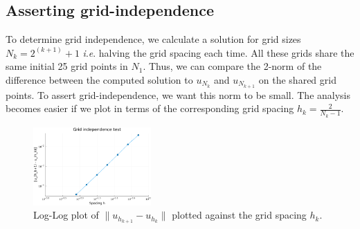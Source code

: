 \documentclass{article}
\numberwithin{equation}{section}
\theoremstyle{definition}
\newcommand{\ie}{\textit{i}.\textit{e}. }
\newcommand{\ppn}[3]{\frac{\partial^{#1} #2}{\partial #3^{#1}}}
\begin{document}
\subsection{Asserting grid-independence}
To determine grid independence, we calculate a solution for grid sizes $N_k = 2^(k+1)+1$ \ie halving the grid spacing each time. All these grids share the same initial 25 grid points in $N_1$. Thus, we can compare the 2-norm of the difference between the computed solution to $u_{N_k}$ and $u_{N_{k+1}}$ on the shared grid points. To assert grid-independence, we want this norm to be small. The analysis becomes easier if we plot in terms of the corresponding grid spacing $h_k = \frac{2}{N_k - 1}$.

\begin{figure}[H]
    \centering
    \includegraphics[width=0.4\textwidth]{fig6.png}
    \caption{Log-Log plot of $\|u_{h_{k+1}} - u_{h_k}\|$ plotted against the grid spacing $h_k$.}
    \label{fig:fig6}
\end{figure}
\end{document}
